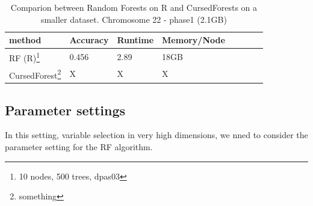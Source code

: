 \documentclass[10pt,letterpaper]{article}
\begin{document}
\begin{table}
\begin{minipage}{\textwidth}
\begin{center}
\begin{tabular}{|p{4.2cm}|l|l|l|l|l|l|l|}
\hline
\bf{method} & \bf{Accuracy} & \bf{Runtime} & \bf{Memory/Node} \\
\hline
RF (R)\footnote{10 nodes, 500 trees, dpas03} 
                                   &  0.456 & 2.89 & 18GB \\ \hline
CursedForest\footnote{something}
                                   & X & X & X \\ \hline
\end{tabular}
\medskip
\begin{flushleft} 
\caption{Comparion between Random Forests on R and CursedForests on a smaller
dataset. Chromosome 22 - phase1 (2.1GB) }
\label{table:smaller_data}
\end{flushleft}
\end{center}
\end{minipage}
\end{table}









\subsection*{Parameter settings}
In this setting, variable selection in very high dimensions, we nned to consider the parameter setting for the RF
algorithm. 
\end{document}
